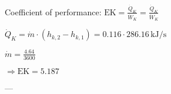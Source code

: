 Coefficient of performance:  
\( \text{EK} = \frac{\dot{Q}_{K}}{\dot{W}_{K}} = \frac{\dot{Q}_{K}}{\dot{W}_{K}} \)  

\( \dot{Q}_{K} = \dot{m} \cdot (h_{k,2} - h_{k,1}) = 0.116 \cdot 286.16 \, \text{kJ/s} \)  

\( \dot{m} = \frac{4.64}{3600} \)  

\( \Rightarrow \text{EK} = 5.187 \)  

---